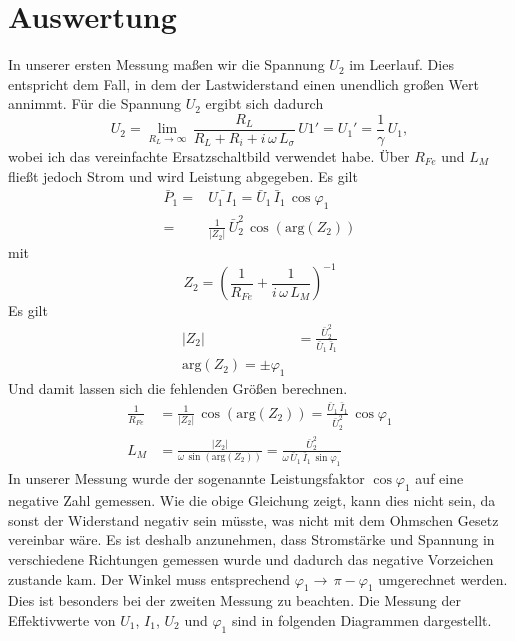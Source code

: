 \documentclass[a4paper, 12pt,]{scrartcl}
\begin{document}
\section{Auswertung}
In unserer ersten Messung maßen wir die Spannung $U_2$ im Leerlauf. Dies entspricht dem Fall, in dem der Lastwiderstand einen unendlich großen Wert annimmt. Für die Spannung $U_2$ ergibt sich dadurch
$$U_2=\lim_{R_L\to\infty}\,\frac{R_L}{R_L+R_i+i\,\omega\,L_{\sigma}}\,U1'=U_1'=\frac{1}{\gamma}\,U_1,$$
wobei ich das vereinfachte Ersatzschaltbild verwendet habe. Über $R_{Fe}$ und $L_M$ fließt jedoch Strom und wird Leistung abgegeben. Es gilt
\begin{align*}\bar{P}_1=&\bar{U_1\,I_1}=\bar{U}_1\,\bar{I}_1\,\cos\varphi_1\\
=&\frac{1}{|Z_2|}\,\bar{U}_2^2\,\cos(\text{arg}(Z_2))\end{align*}
mit 
$$Z_2=\left(\frac{1}{R_{Fe}}+\frac{1}{i\,\omega\,L_M}\right)^{-1}$$
Es gilt 
\begin{align*}|Z_2|&=\frac{\bar{U}_2^2}{\bar{U}_1\,\bar{I}_1}\\
\text{arg}(Z_2)=\pm\varphi_1\end{align*}
Und damit lassen sich die fehlenden Größen berechnen.
\begin{align*}\frac{1}{R_{Fe}}&=\frac{1}{|Z_2|}\,\cos(\text{arg}(Z_2))=\frac{\bar{U}_1\,\bar{I}_1}{\bar{U}_2^2}\,\cos\varphi_1\\
L_M&=\frac{|Z_2|}{\omega\,\sin(\text{arg}(Z_2))}=\frac{\bar{U}_2^2}{\omega\,\bar{U}_1\,\bar{I}_1\,\sin\varphi_1}\end{align*}
In unserer Messung wurde der sogenannte Leistungsfaktor $\cos\varphi_1$ auf eine negative Zahl gemessen. Wie die obige Gleichung zeigt, kann dies nicht sein, da sonst der Widerstand negativ sein müsste, was nicht mit dem Ohmschen Gesetz vereinbar wäre. Es ist deshalb anzunehmen, dass Stromstärke und Spannung in verschiedene Richtungen gemessen wurde und dadurch das negative Vorzeichen zustande kam. Der Winkel muss entsprechend $\varphi_1\rightarrow\,\pi-\varphi_1$ umgerechnet werden. Dies ist besonders bei der zweiten Messung zu beachten.\newline
Die Messung der Effektivwerte von $U_1$, $I_1$, $U_2$ und $\varphi_1$ sind in folgenden Diagrammen dargestellt.
\end{document}
